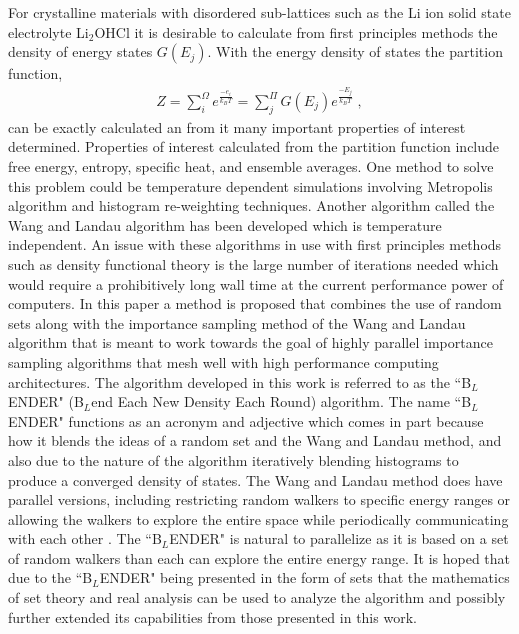 \documentclass[twocolumn]{article}
\begin{document}
For crystalline materials  with disordered sub-lattices such as the Li ion solid state electrolyte  Li$_2$OHCl it is desirable to calculate from first principles methods the density of energy states $G(E_j)$. With the energy density of states the partition function,
\begin{equation}
\begin{split}
Z = \sum_{i}^{\Omega}e^{\frac{-e_i}{k_B T} }= \sum_{j}^{\Pi}G(E_j)e^{\frac{-E_j}{k_BT}} \;,
\end{split}
\end{equation}
 can be exactly calculated an from it many important properties of interest determined. Properties of interest calculated from the partition function include  free energy, entropy, specific heat, and ensemble averages. One method to solve this problem could be temperature dependent simulations involving  Metropolis algorithm and histogram re-weighting techniques\cite{landau_MC_simulations}.  Another algorithm called the  Wang and Landau algorithm\cite{WL_phys_rev_lett} has been developed which is temperature independent. An issue with these algorithms in use with first principles methods such as density functional theory is the large number of iterations needed which would require a prohibitively long wall time at the current performance power of computers.  In this paper a method is proposed that combines the use of random sets along with the importance sampling method of the Wang and Landau algorithm that is meant to work towards the goal of highly parallel importance sampling algorithms that mesh well with high performance computing architectures. The algorithm developed in this work is referred to as the ``B$_{L}$ENDER" (B$_{L}$end Each New Density Each Round) algorithm. The name ``B$_{L}$ENDER" functions as an acronym and adjective which comes in part because how it blends the ideas of a random set and the Wang and Landau method, and also due to the nature of the algorithm iteratively blending histograms to produce a converged density of states.  The Wang and Landau method does have parallel versions, including  restricting random walkers to specific energy ranges or allowing the walkers to explore the entire space while periodically communicating with each other \cite{MP_Wang_Landau,P_imp_Wang_Landau, Hframe_Wang_Landau}. The ``B$_{L}$ENDER" is natural to parallelize as it is based on a set of random walkers than each can explore the entire energy range. It is hoped that due to the ``B$_{L}$ENDER" being presented in the form of sets that the mathematics of set theory and real analysis can be used to analyze the algorithm and possibly further extended its capabilities from those presented in this work. 
\end{document}
